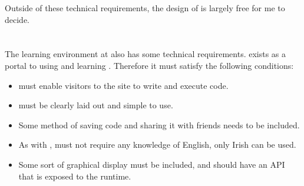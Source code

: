 Outside of these technical requirements, the design of \Setanta{} is largely free for me to decide.

\section{\trys{}}

The learning environment at \trys{} also has some technical requirements. \trys{} exists as a portal to using and learning \Setanta{}. Therefore it must satisfy the following conditions:
\begin{itemize}
    \item \trys{} must enable visitors to the site to write and execute \Setanta{} code.
    \item \trys{} must be clearly laid out and simple to use.
    \item Some method of saving code and sharing it with friends needs to be included.
    \item As with \Setanta{}, \trys{} must not require any knowledge of English, only Irish can be used.
    \item Some sort of graphical display must be included, and should have an API that is exposed to the \Setanta{} runtime.
\end{itemize}

